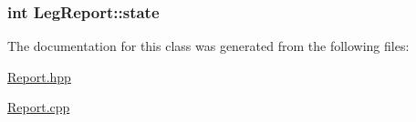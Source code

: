 \subsubsection[{\texorpdfstring{state}{state}}]{\setlength{\rightskip}{0pt plus 5cm}int Leg\+Report\+::state}\hypertarget{classLegReport_a16ea3a41dccb407558bcd32c3074255f}{}\label{classLegReport_a16ea3a41dccb407558bcd32c3074255f}


The documentation for this class was generated from the following files\+:\begin{DoxyCompactItemize}
\item 
\hyperlink{Report_8hpp}{Report.\+hpp}\item 
\hyperlink{Report_8cpp}{Report.\+cpp}\end{DoxyCompactItemize}
